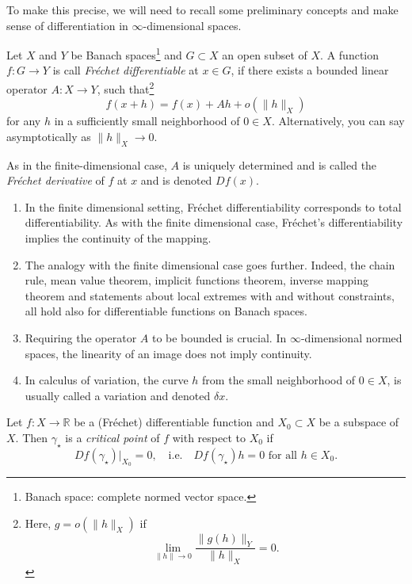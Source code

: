 \documentclass[english,fontsize=11pt,paper=a5,oneside]{scrbook}
\newcommand{\R}{\mathbb{R}}
\theoremstyle{definition}
\newenvironment{remark}
  {\pushQED{\qed}\renewcommand{\qedsymbol}{$\lozenge$}\remarkx}
  {\popQED\endremarkx}
\begin{document}
To make this precise, we will need to recall some preliminary concepts and make sense of differentiation in $\infty$-dimensional spaces.

Let $X$ and $Y$ be Banach spaces\footnote{Banach space: complete normed vector space.}  and $G\subset X$ an open subset of $X$.
A function $f: G \to Y$ is call \emph{Fr\'echet differentiable} at $x\in G$, if there exists a bounded linear operator $A: X \to Y$, such that\footnote{Here, $g = o(\|h\|_X)$ if 
\begin{equation}
    \lim_{\|h\| \to 0} \frac{\|g(h)\|_Y}{\|h\|_X} = 0.
\end{equation}
}
\begin{equation}\label{eq:frechetdiff}
    f(x+h) = f(x) + Ah + o(\|h\|_X)
\end{equation}
for any $h$ in a sufficiently small neighborhood of $0\in X$. Alternatively, you can say asymptotically as $\|h\|_X\to 0$.

As in the finite-dimensional case, $A$ is uniquely determined and is called the \emph{Fr\'echet derivative} of $f$ at $x$ and is denoted $D f(x)$.

\begin{remark}
    \begin{enumerate}
        \item In the finite dimensional setting, Fr\'echet differentiability corresponds to total differentiability. As with the finite dimensional case, Fr\'echet's differentiability implies the continuity of the mapping.
        \item The analogy with the finite dimensional case goes further. Indeed, the chain rule, mean value theorem, implicit functions theorem, inverse mapping theorem and statements about local extremes with and without constraints, all hold also for differentiable functions on Banach spaces.
        \item Requiring the operator $A$ to be bounded is crucial. In $\infty$-dimensional normed spaces, the linearity of an image does not imply continuity.
        \item In calculus of variation, the curve $h$ from the small neighborhood of $0\in X$, is usually called a variation and denoted $\delta x$.
    \end{enumerate}
\end{remark}

Let $f: X \to \R$ be a (Fr\'echet) differentiable function and $X_0 \subset X$ be a subspace of $X$. Then $\gamma_\star$ is a \emph{critical point} of $f$ with respect to $X_0$ if
\begin{equation}
    Df(\gamma_\star)\Big|_{X_0} = 0, \quad\mbox{i.e.}\quad
    Df(\gamma_\star)h = 0 \mbox{ for all } h\in X_0.
\end{equation}
\end{document}
